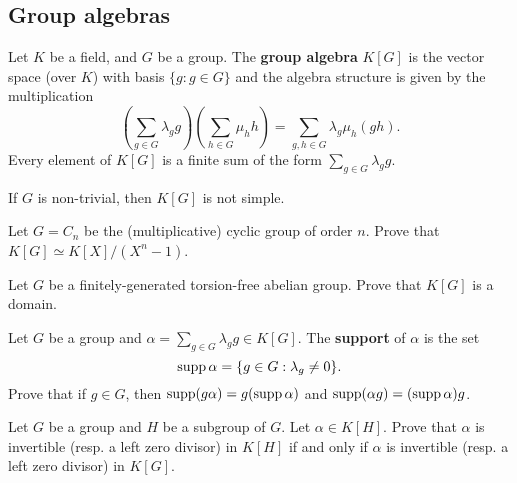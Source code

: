 
\subsection{Group algebras}

Let $K$ be a field, and $G$ be a group. The \textbf{group algebra} $K[G]$ 
is the vector space (over $K$) with basis $\{g:g\in G\}$ 
and the algebra structure is given by the multiplication
\[
	\left(\sum_{g\in G}\lambda_gg\right)\left(\sum_{h\in G}\mu_hh\right)
	=\sum_{g,h\in G}\lambda_g\mu_h(gh).
\]
Every element of $K[G]$ is a finite sum of the form $\sum_{g\in G}\lambda_gg$.

\begin{exercise}
\label{xc:K[G]notsimple}
    If $G$ is non-trivial, then $K[G]$ is not simple. 
\end{exercise}

\begin{exercise}
\label{xca:K_cyclic}
	Let $G=C_n$ be the (multiplicative) cyclic group of order $n$. Prove that 
	$K[G]\simeq K[X]/(X^n-1)$. 
\end{exercise}

\begin{exercise}
\label{xca:abelian=>domain}
	Let $G$ be a finitely-generated torsion-free abelian group. Prove that 
	$K[G]$ is a domain. 
\end{exercise}



\begin{exercise}
	Let $G$ be a group and $\alpha=\sum_{g\in G}\lambda_gg\in K[G]$.  
	The \textbf{support} of $\alpha$ is the set 
	\[
		\operatorname{supp}\alpha=\{g\in G:\lambda_g\ne 0\}.
	\]
	Prove that if $g\in G$, then 
	$\operatorname{supp}(g\alpha)=g(\operatorname{supp}\alpha)$ and $\operatorname{supp}(\alpha g)=(\operatorname{supp}\alpha)g$.
\end{exercise}

\begin{exercise}
\label{xca:invertible_subgroups}
	Let $G$ be a group and $H$ be a subgroup of $G$. Let $\alpha\in K[H]$. Prove that 
    $\alpha$ is invertible (resp. a left zero divisor) in $K[H]$ if and only if 
	$\alpha$ is invertible (resp. a left zero divisor) in
	$K[G]$.
\end{exercise}

